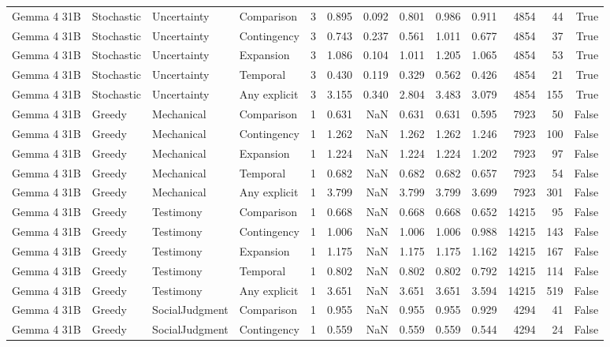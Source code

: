 \begin{tabular}{llllrrrrrrrrr}
Gemma 4 31B & Stochastic & Uncertainty & Comparison & 3 & 0.895 & 0.092 & 0.801 & 0.986 & 0.911 & 4854 & 44 & True \\
Gemma 4 31B & Stochastic & Uncertainty & Contingency & 3 & 0.743 & 0.237 & 0.561 & 1.011 & 0.677 & 4854 & 37 & True \\
Gemma 4 31B & Stochastic & Uncertainty & Expansion & 3 & 1.086 & 0.104 & 1.011 & 1.205 & 1.065 & 4854 & 53 & True \\
Gemma 4 31B & Stochastic & Uncertainty & Temporal & 3 & 0.430 & 0.119 & 0.329 & 0.562 & 0.426 & 4854 & 21 & True \\
Gemma 4 31B & Stochastic & Uncertainty & Any explicit & 3 & 3.155 & 0.340 & 2.804 & 3.483 & 3.079 & 4854 & 155 & True \\
Gemma 4 31B & Greedy & Mechanical & Comparison & 1 & 0.631 & NaN & 0.631 & 0.631 & 0.595 & 7923 & 50 & False \\
Gemma 4 31B & Greedy & Mechanical & Contingency & 1 & 1.262 & NaN & 1.262 & 1.262 & 1.246 & 7923 & 100 & False \\
Gemma 4 31B & Greedy & Mechanical & Expansion & 1 & 1.224 & NaN & 1.224 & 1.224 & 1.202 & 7923 & 97 & False \\
Gemma 4 31B & Greedy & Mechanical & Temporal & 1 & 0.682 & NaN & 0.682 & 0.682 & 0.657 & 7923 & 54 & False \\
Gemma 4 31B & Greedy & Mechanical & Any explicit & 1 & 3.799 & NaN & 3.799 & 3.799 & 3.699 & 7923 & 301 & False \\
Gemma 4 31B & Greedy & Testimony & Comparison & 1 & 0.668 & NaN & 0.668 & 0.668 & 0.652 & 14215 & 95 & False \\
Gemma 4 31B & Greedy & Testimony & Contingency & 1 & 1.006 & NaN & 1.006 & 1.006 & 0.988 & 14215 & 143 & False \\
Gemma 4 31B & Greedy & Testimony & Expansion & 1 & 1.175 & NaN & 1.175 & 1.175 & 1.162 & 14215 & 167 & False \\
Gemma 4 31B & Greedy & Testimony & Temporal & 1 & 0.802 & NaN & 0.802 & 0.802 & 0.792 & 14215 & 114 & False \\
Gemma 4 31B & Greedy & Testimony & Any explicit & 1 & 3.651 & NaN & 3.651 & 3.651 & 3.594 & 14215 & 519 & False \\
Gemma 4 31B & Greedy & SocialJudgment & Comparison & 1 & 0.955 & NaN & 0.955 & 0.955 & 0.929 & 4294 & 41 & False \\
Gemma 4 31B & Greedy & SocialJudgment & Contingency & 1 & 0.559 & NaN & 0.559 & 0.559 & 0.544 & 4294 & 24 & False \\

\end{tabular}
